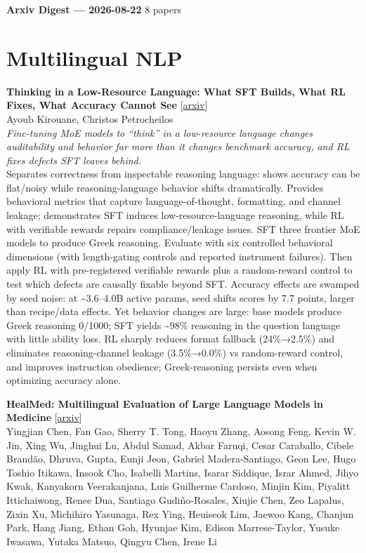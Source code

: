 \documentclass[12pt,letterpaper]{article}
\begin{document}
{\footnotesize\textbf{Arxiv Digest --- 2026-08-22} \hfill 8 papers}

\smallskip

\section*{Multilingual NLP}

{\small\textbf{Thinking in a Low-Resource Language: What SFT Builds, What RL Fixes, What Accuracy Cannot See}} {\scriptsize[\href{https://arxiv.org/abs/2608.17744}{arxiv}]}\\
{\scriptsize Ayoub Kirouane, Christos Petrocheilos}\\

{\small\textit{Fine-tuning MoE models to ``think'' in a low-resource language changes auditability and behavior far more than it changes benchmark accuracy, and RL fixes defects SFT leaves behind.}}\\[1pt]
{\footnotesize Separates correctness from inspectable reasoning language: shows accuracy can be flat/noisy while reasoning-language behavior shifts dramatically. Provides behavioral metrics that capture language-of-thought, formatting, and channel leakage; demonstrates SFT induces low-resource-language reasoning, while RL with verifiable rewards repairs compliance/leakage issues. SFT three frontier MoE models to produce Greek reasoning. Evaluate with six controlled behavioral dimensions (with length-gating controls and reported instrument failures). Then apply RL with pre-registered verifiable rewards plus a random-reward control to test which defects are causally fixable beyond SFT. Accuracy effects are swamped by seed noise: at \textasciitilde{}3.6--4.0B active params, seed shifts scores by 7.7 points, larger than recipe/data effects. Yet behavior changes are large: base models produce Greek reasoning 0/1000; SFT yields \textasciitilde{}98\% reasoning in the question language with little ability loss. RL sharply reduces format fallback (24\%→2.5\%) and eliminates reasoning-channel leakage (3.5\%→0.0\%) vs random-reward control, and improves instruction obedience; Greek-reasoning persists even when optimizing accuracy alone.}

\medskip

{\small\textbf{HealMed: Multilingual Evaluation of Large Language Models in Medicine}} {\scriptsize[\href{https://arxiv.org/abs/2608.19981}{arxiv}]}\\
{\scriptsize Yingjian Chen, Fan Gao, Sherry T. Tong, Haoyu Zhang, Aosong Feng, Kevin W. Jin, Xing Wu, Jinghui Lu, Abdul Samad, Akbar Faruqi, Cesar Caraballo, Cibele Brandão,  Dhruva,  Gupta, Eunji Jeon, Gabriel Madera-Santiago, Geon Lee, Hugo Toshio Itikawa, Insook Cho, Isabelli Martins, Isarar Siddique, Israr Ahmed, Jihyo Kwak, Kanyakorn Veerakanjana, Luis Guilherme Cardoso, Minjin Kim, Piyalitt Ittichaiwong, Renee Dua, Santiago Gudiño-Rosales, Xiujie Chen, Zeo Lapalus, Zixin Xu, Michihiro Yasunaga, Rex Ying, Heuiseok Lim, Jaewoo Kang, Chanjun Park, Hang Jiang, Ethan Goh, Hyunjae Kim, Edison Marrese-Taylor, Yusuke Iwasawa, Yutaka Matsuo, Qingyu Chen, Irene Li}\\
\end{document}
